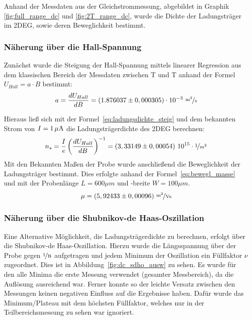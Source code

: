 

Anhand der Messdaten aus der Gleichstrommessung, abgebildet in Graphik \ref{fig:full_range_dc} und \ref{fig:2T_range_dc}, wurde die Dichte der Ladungsträger im 2DEG, sowie deren Beweglichkeit bestimmt.

\subsubsection{Näherung über die Hall-Spannung}
\label{ch:naeherung_hall}

Zunächst wurde die Steigung der Hall-Spannung mittels linearer Regression aus dem klassischen Bereich der Messdaten zwischen \unit[-2]{T} und \unit[2]{T} anhand der Formel $ U_{Hall}=a\cdot B $  
bestimmt:
\begin{equation}
	a=\d{U_{Hall}}{B} = (1.876037 \pm 0,000305)\cdot10^{-3} ~  \unitfrac{m^2}{s}
\end{equation} %

Hieraus ließ sich mit der Formel~\eqref{eq:ladungsdichte_steig} und dem bekannten Strom von $I=\unit[1]{\mu A}$ die Ladungsträgerdichte des 2DEG berechnen: 
\begin{equation}
	n_s= \frac{I}{e}\left({\d{U_{Hall}}{B}}\right)^{-1}=(3,33149 \pm 0,00054) ~ 10^{15}\cdot \unitfrac{1}{m^2}
\end{equation} %
Mit den Bekannten Maßen der Probe wurde anschließend die Beweglichkeit der Ladungsträger bestimmt. Dies erfolgte anhand der Formel~\ref{eq:bewegl_masse} und mit der Probenlänge $L=600\mu m$ und -breite $W=100\mu m$.\\
\begin{equation}
\mu= (5,92433\pm 0,00096) ~ \unitfrac{m^2}{Vs} %
\end{equation}


 
\subsubsection{Näherung über die Shubnikov-de Haas-Oszillation}
\label{ch:naeherung_sdho}

Eine Alternative Möglichkeit, die Ladungsträgerdichte zu berechnen, erfolgt über die Shubnikov-de Haas-Oszillation. Hierzu wurde die Längsspannung über der Probe 
 gegen $\unitfrac{1}{B}$ aufgetragen und jedem Minimum der Oszillation ein Füllfaktor $\nu$ zugeordnet. Dies ist in Abbildung~\ref{fig:dc_sdho_ausw} zu sehen. Es wurde für den alle Minima die erste Messung verwendet (gesamter Messbereich), da die Auflösung ausreichend war. Ferner konnte so der leichte Versatz zwischen den Messungen keinen negativen Einfluss auf die Ergebnisse haben. Dafür wurde das Minimum/Plateau mit dem höchsten Füllfaktor, welches nur in der Teilbereichsmessung zu sehen war ignoriert.
 
